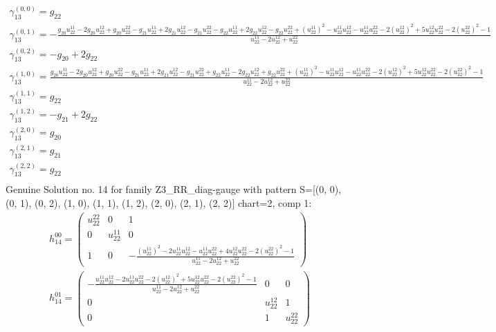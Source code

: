 \documentclass[a4paper, 11pt, twoside, onecolumn]{article}
\begin{document}
\begin{landscape}
\begin{gather*} 
	 \gamma^{(0, 0)}_13=g_{22}\\ 
	 \gamma^{(0, 1)}_13=- \frac{g_{20} u^{11}_{22} - 2 g_{20} u^{12}_{22} + g_{20} u^{22}_{22} - g_{21} u^{11}_{22} + 2 g_{21} u^{12}_{22} - g_{21} u^{22}_{22} - g_{22} u^{11}_{22} + 2 g_{22} u^{12}_{22} - g_{22} u^{22}_{22} + \left(u^{11}_{22}\right)^{2} - u^{11}_{22} u^{12}_{22} - u^{11}_{22} u^{22}_{22} - 2 \left(u^{12}_{22}\right)^{2} + 5 u^{12}_{22} u^{22}_{22} - 2 \left(u^{22}_{22}\right)^{2} - 1}{u^{11}_{22} - 2 u^{12}_{22} + u^{22}_{22}}\\ 
	 \gamma^{(0, 2)}_13=- g_{20} + 2 g_{22}\\ 
	 \gamma^{(1, 0)}_13=\frac{g_{20} u^{11}_{22} - 2 g_{20} u^{12}_{22} + g_{20} u^{22}_{22} - g_{21} u^{11}_{22} + 2 g_{21} u^{12}_{22} - g_{21} u^{22}_{22} + g_{22} u^{11}_{22} - 2 g_{22} u^{12}_{22} + g_{22} u^{22}_{22} + \left(u^{11}_{22}\right)^{2} - u^{11}_{22} u^{12}_{22} - u^{11}_{22} u^{22}_{22} - 2 \left(u^{12}_{22}\right)^{2} + 5 u^{12}_{22} u^{22}_{22} - 2 \left(u^{22}_{22}\right)^{2} - 1}{u^{11}_{22} - 2 u^{12}_{22} + u^{22}_{22}}\\ 
	 \gamma^{(1, 1)}_13=g_{22}\\ 
	 \gamma^{(1, 2)}_13=- g_{21} + 2 g_{22}\\ 
	 \gamma^{(2, 0)}_13=g_{20}\\ 
	 \gamma^{(2, 1)}_13=g_{21}\\ 
	 \gamma^{(2, 2)}_13=g_{22}\\ 
\end{gather*} 
Genuine Solution no. 14 for family Z3_RR_diag-gauge with pattern S=[(0, 0), (0, 1), (0, 2), (1, 0), (1, 1), (1, 2), (2, 0), (2, 1), (2, 2)] chart=2, comp 1: 
\begin{gather*} 
	 h_14^{00}=\begin{pmatrix}u^{22}_{22} & 0 & 1\\0 & u^{11}_{22} & 0\\1 & 0 & - \frac{\left(u^{11}_{22}\right)^{2} - 2 u^{11}_{22} u^{12}_{22} - u^{11}_{22} u^{22}_{22} + 4 u^{12}_{22} u^{22}_{22} - 2 \left(u^{22}_{22}\right)^{2} - 1}{u^{11}_{22} - 2 u^{12}_{22} + u^{22}_{22}}\end{pmatrix}\\ 
	 h_14^{01}=\begin{pmatrix}- \frac{u^{11}_{22} u^{12}_{22} - 2 u^{11}_{22} u^{22}_{22} - 2 \left(u^{12}_{22}\right)^{2} + 5 u^{12}_{22} u^{22}_{22} - 2 \left(u^{22}_{22}\right)^{2} - 1}{u^{11}_{22} - 2 u^{12}_{22} + u^{22}_{22}} & 0 & 0\\0 & u^{12}_{22} & 1\\0 & 1 & u^{22}_{22}\end{pmatrix}\\ 

\end{gather*}
\end{landscape}
\end{document}
